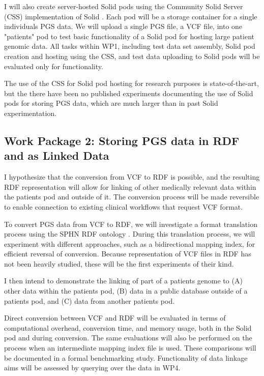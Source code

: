 \documentclass[a4paper,11pt]{article}
\begin{document}
I will also create server-hosted Solid pods using the Community Solid Server (CSS) implementation of Solid \cite{css}. 
Each pod will be a storage container for a single individual\textquotesingle s PGS data. 
We will upload a single PGS file, a VCF file, into one "patient\textquotesingle s" pod to test basic functionality of a Solid pod for hosting large patient genomic data. 
All tasks within WP1, including test data set assembly, Solid pod creation and hosting using the CSS, and test data uploading to Solid pods will be evaluated only for functionality.

The use of the CSS for Solid pod hosting for research purposes is state-of-the-art, but the there have been no published experiments documenting the use of Solid pods for storing PGS data, which are much larger than in past Solid experimentation. 


\subsection{Work Package 2:  Storing PGS data in RDF and as Linked Data}

I hypothesize that the conversion from VCF to RDF is possible, and the resulting RDF representation will allow for linking of other medically relevant data within the patient\textquotesingle s pod and outside of it.
The conversion process will be made reversible to enable connection to existing clinical workflows that request VCF format. 

To convert PGS data from VCF to RDF, we will investigate a format translation process using the SPHN RDF ontology \cite{van_der_horst_bridging_2023}. 
During this translation process, we will experiment with different approaches, such as a bidirectional mapping index, for efficient reversal of conversion.
Because representation of VCF files in RDF has not been heavily studied, these will be the first experiments of their kind.

I then intend to demonstrate the linking of part of a patient\textquotesingle s genome to
(A) other data within the patient\textquotesingle s pod, 
(B) data in a public database outside of a patient\textquotesingle s pod, and
(C) data from another patient\textquotesingle s pod.

Direct conversion between VCF and RDF will be evaluated in terms of computational overhead, conversion time, and memory usage, both in the Solid pod and during conversion.
The same evaluations will also be performed on the process when an intermediate mapping index file is used. 
These comparisons will be documented in a formal benchmarking study.
Functionality of data linkage aims will be assessed by querying over the data in WP4.
\end{document}
